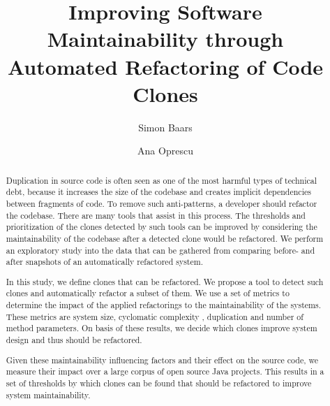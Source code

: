 \documentclass[sigconf,review, table]{acmart}
\begin{document}
\title{Improving Software Maintainability through Automated Refactoring of Code Clones}

\author{Simon Baars}

\author{Ana Oprescu}

\begin{abstract}
Duplication in source code is often seen as one of the most harmful types of technical debt, because it increases the size of the codebase and creates implicit dependencies between fragments of code. To remove such anti-patterns, a developer should refactor the codebase. There are many tools that assist in this process. The thresholds and prioritization of the clones detected by such tools can be improved by considering the maintainability of the codebase after a detected clone would be refactored. We perform an exploratory study into the data that can be gathered from comparing before- and after snapshots of an automatically refactored system.

In this study, we define clones that can be refactored. We propose a tool to detect such clones and automatically refactor a subset of them. We use a set of metrics to determine the impact of the applied refactorings to the maintainability of the systems. These metrics are system size, cyclomatic complexity \cite{mccabe1976complexity}, duplication and number of method parameters. On basis of these results, we decide which clones improve system design and thus should be refactored. %

Given these maintainability influencing factors and their effect on the source code, we measure their impact over a large corpus of open source Java projects. This results in a set of thresholds by which clones can be found that should be refactored to improve system maintainability.
\end{abstract}

\end{document}
